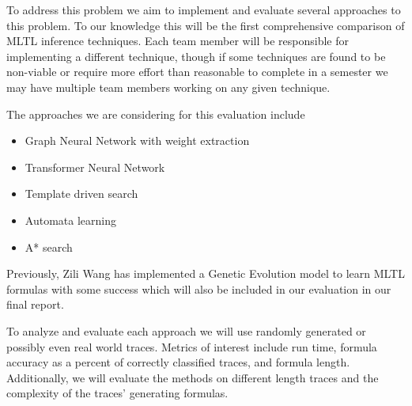 \documentclass[12pt]{article}
\begin{document}
To address this problem we aim to implement and evaluate several approaches to this problem.  To our knowledge this will be the first comprehensive comparison of MLTL inference techniques.  Each team member will be responsible for implementing a different technique, though if some techniques are found to be non-viable or require more effort than reasonable to complete in a semester we may have multiple team members working on any given technique.

The approaches we are considering for this evaluation include
\begin{itemize}
    \item Graph Neural Network with weight extraction
    \item Transformer Neural Network
    \item Template driven search
    \item Automata learning
    \item A* search
\end{itemize}

Previously, Zili Wang has implemented a Genetic Evolution model to learn MLTL formulas with some success which will also be included in our evaluation in our final report.

To analyze and evaluate each approach we will use randomly generated or possibly even real world traces.  Metrics of interest include run time, formula accuracy as a percent of correctly classified traces, and formula length.  Additionally, we will evaluate the methods on different length traces and the complexity of the traces' generating formulas.


\newpage
\end{document}
